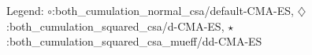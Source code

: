 Legend: {\color{CornflowerBlue}$\circ$}:both\_cumulation\_normal\_csa/default-CMA-ES, {\color{Orange}$\diamondsuit$}:both\_cumulation\_squared\_csa/d-CMA-ES, {\color{Green}$\star$}:both\_cumulation\_squared\_csa\_mueff/dd-CMA-ES